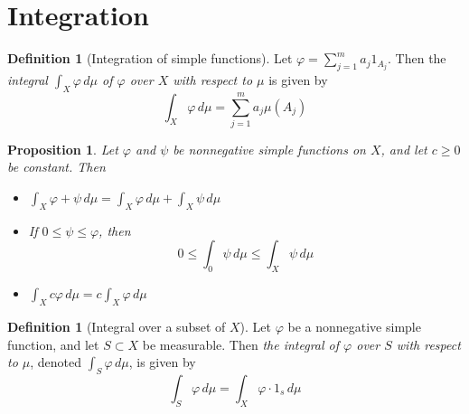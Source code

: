 \documentclass[10pt, oneside, reqno]{amsart}
\theoremstyle{plain}%
\newtheorem{prop}[thm]{Proposition}
\theoremstyle{definition}
\newtheorem{defn}[thm]{Definition}
\theoremstyle{remark}
\newcommand{\dmu}{\, d \mu}
\renewcommand{\phi}{\varphi}
\begin{document}


























\section{Integration} %
\label{sec:integration}





\begin{defn}[Integration of simple functions]
    Let $\phi = \sum_{j=1}^m a_j 1_{A_j}$.  Then the \emph{integral $\int_X \phi \dmu$ of $\phi$ over $X$ with respect to $\mu$} is given by \[
        \int_X \phi \dmu = \sum_{j=1}^m a_j \mu (A_j)
    \]
\end{defn}

\begin{prop}
    Let $\phi$ and $\psi$ be nonnegative simple functions on $X$, and let $c \geq 0$ be constant.  Then \begin{itemize}
        \item $
            \int_X \phi  + \psi \dmu = \int_X \phi \dmu + \int_X \psi \dmu
    $
        \item If $ 0 \leq \psi \leq \phi $, then \[
            0 \leq \int_0 \psi \dmu \leq \int_X \psi \dmu
        \]
        \item $\int_X c \phi \dmu = c \int_X \phi \dmu$
    \end{itemize}
\end{prop}


\begin{defn}[Integral over a subset of $X$]
    Let $\phi$ be a nonnegative simple function, and let $S \subset X$ be measurable.  Then \emph{the integral of $\phi$ over $S$ with respect to $\mu$}, denoted $\int_S \phi \dmu$, is given by \[
        \int_S \phi \dmu = \int_X \phi \cdot 1_s \dmu
    \] 
\end{defn}
\end{document}
